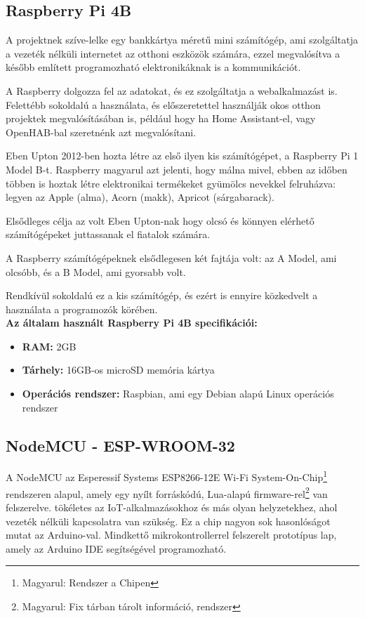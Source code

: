 \documentclass[
]{thesis-ekf}
\theoremstyle{definition}
\theoremstyle{remark}
\begin{document}
	\subsection{Raspberry Pi 4B}
	A projektnek szíve-lelke egy bankkártya méretű mini számítógép, ami szolgáltatja a vezeték nélküli internetet az otthoni eszközök számára, ezzel megvalósítva a később említett programozható elektronikáknak is a kommunikációt.
	
	A Raspberry dolgozza fel az adatokat, és ez szolgáltatja a webalkalmazást is. Felettébb sokoldalú a használata, és előszeretettel használják okos otthon projektek megvalósításában is, például hogy ha Home Assistant-el, vagy OpenHAB-bal szeretnénk azt megvalósítani.
	
	Eben Upton 2012-ben hozta létre az első ilyen kis számítógépet, a Raspberry Pi 1 Model B-t. Raspberry magyarul azt jelenti, hogy málna mivel, ebben az időben többen is hoztak létre elektronikai termékeket gyümölcs nevekkel felruházva: legyen az Apple (alma), Acorn (makk), Apricot (sárgabarack).
	
	Elsődleges célja az volt Eben Upton-nak hogy olcsó és könnyen elérhető számítógépeket juttassanak el fiatalok számára.
	
	A Raspberry számítógépeknek elsődlegesen két fajtája volt: az A Model, ami olcsóbb, és a B Model, ami gyorsabb volt.\cite{raspberrypi-history}
	
	Rendkívül sokoldalú ez a kis számítógép, és ezért is ennyire közkedvelt a használata a programozók körében.\\
	\textbf{Az általam használt Raspberry Pi 4B specifikációi:}
	\begin{itemize}
		\item \textbf{RAM:} 2GB
		\item \textbf{Tárhely:} 16GB-os microSD memória kártya
		\item \textbf{Operációs rendszer:} Raspbian, ami egy Debian alapú Linux operációs rendszer
	\end{itemize}
	
	\subsection{NodeMCU - ESP-WROOM-32}\label{nodemcu-sec}
	
	A NodeMCU az Esperessif Systems ESP8266-12E Wi-Fi System-On-Chip\footnote{Magyarul: Rendszer a Chipen} rendszeren alapul, amely egy nyílt forráskódú, Lua-alapú firmware-rel\footnote{Magyarul: Fix tárban tárolt információ, rendszer} van felszerelve. tökéletes az IoT-alkalmazásokhoz és más olyan helyzetekhez, ahol vezeték nélküli kapcsolatra van szükség. Ez a chip nagyon sok hasonlóságot mutat az Arduino-val. Mindkettő mikrokontrollerrel felszerelt prototípus lap, amely az Arduino IDE segítségével programozható.\cite{esp-8266}
	
\end{document}
